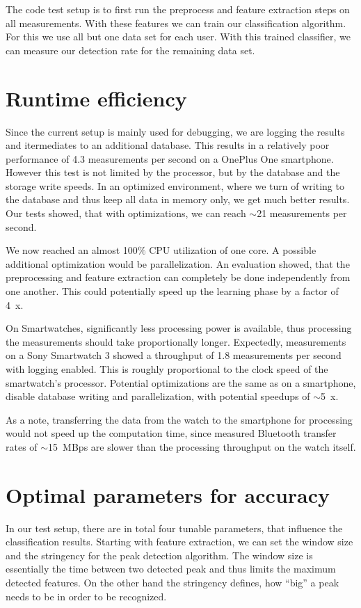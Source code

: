 The code test setup is to first run the preprocess and feature extraction steps on all measurements. With these features we can train our classification algorithm. For this we use all but one data set for each user. With this trained classifier, we can measure our detection rate for the remaining data set.

\section{Runtime efficiency}\label{section:runtime}
Since the current setup is mainly used for debugging, we are logging the results and itermediates to an additional database. This results in a relatively poor performance of \num{4.3} measurements per second on a OnePlus One smartphone. However this test is not limited by the processor, but by the database and the storage write speeds. In an optimized environment, where we turn of writing to the database and thus keep all data in memory only, we get much better results. Our tests showed, that with optimizations, we can reach $\sim$\num{21} measurements per second.

We now reached an almost \num{100}$\%$ CPU utilization of one core. A possible additional optimization would be parallelization. An evaluation showed, that the preprocessing and feature extraction can completely be done independently from one another. This could potentially speed up the learning phase by a factor of \SI{4}{x}.

On Smartwatches, significantly less processing power is available, thus processing the measurements should take proportionally longer. Expectedly, measurements on a Sony Smartwatch 3 showed a throughput of \num{1.8} measurements per second with logging enabled. This is roughly proportional to the clock speed of the smartwatch's processor. Potential optimizations are the same as on a smartphone, \ie disable database writing and parallelization, with potential speedups of $\sim$\SI{5}{x}. 

As a note, transferring the data from the watch to the smartphone for processing would not speed up the computation time, since measured Bluetooth transfer rates of $\sim$\SI{15}{MBps} are slower than the processing throughput on the watch itself.

\section{Optimal parameters for accuracy}\label{section:parameters}
In our test setup, there are in total four tunable parameters, that influence the classification results. Starting with feature extraction, we can set the window size and the stringency for the peak detection algorithm. The window size is essentially the time between two detected peak and thus limits the maximum detected features. On the other hand the stringency defines, how ``big'' a peak needs to be in order to be recognized.

